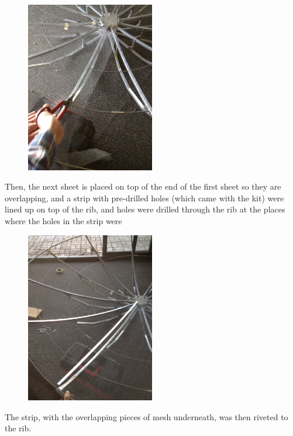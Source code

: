 \documentclass[11pt]{article} %
\begin{document}
\begin{figure}
  \centering
  \caption{   }
  \includegraphics[width=0.50\textwidth]{dish/13.jpeg}
\end{figure}

Then, the next sheet is placed on top of the end of the first sheet so they are overlapping, and a strip with pre-drilled holes (which came with the kit) were lined up on top of the rib, and holes were drilled through the rib at the places where the holes in the strip were

\begin{figure}
  \centering
  \caption{   }
  \includegraphics[width=0.50\textwidth]{dish/14.jpeg}
\end{figure}

The strip, with the overlapping pieces of mesh underneath, was then riveted to the rib.
\end{document}
